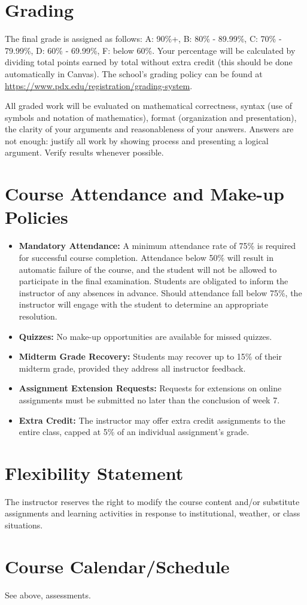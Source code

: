 \documentclass{article}
\begin{document}
	\section*{Grading}
	The final grade is assigned as follows: A: 90\%+, B: 80\% - 89.99\%, C: 70\% -
	79.99\%, D: 60\% - 69.99\%, F: below 60\%. Your percentage will be calculated
	by dividing total points earned by total without extra credit (this should be done
	automatically in Canvas). The school's grading policy can be found at
    \url{https://www.pdx.edu/registration/grading-system}.

	\noindent
	All graded work will be evaluated on mathematical correctness, syntax (use of symbols
	and notation of mathematics), format (organization and presentation), the
	clarity of your arguments and reasonableness of your answers. Answers are not enough:
	justify all work by showing process and presenting a logical argument. Verify results
	whenever possible.

	\section*{Course Attendance and Make-up Policies}
	\begin{itemize}
		\item \textbf{Mandatory Attendance:} A minimum attendance rate of 75\% is required
			for successful course completion. Attendance below 50\% will result in automatic
			failure of the course, and the student will not be allowed to participate
			in the final examination. Students are obligated to inform the instructor of
			any absences in advance. Should attendance fall below 75\%, the instructor
			will engage with the student to determine an appropriate resolution.

		\item \textbf{Quizzes:} No make-up opportunities are available for missed
			quizzes.

		\item \textbf{Midterm Grade Recovery:} Students may recover up to 15\% of their
			midterm grade, provided they address all instructor feedback.

		\item \textbf{Assignment Extension Requests:} Requests for extensions on
			online assignments must be submitted no later than the conclusion of week
			7.

		\item \textbf{Extra Credit:} The instructor may offer extra credit
			assignments to the entire class, capped at 5\% of an individual assignment's
			grade.
	\end{itemize}

	\section*{Flexibility Statement}
	The instructor reserves the right to modify the course content and/or
	substitute assignments and learning activities in response to institutional, weather,
	or class situations.

	\section*{Course Calendar/Schedule}
	See above, assessments.

    \PSUPolicies
\end{document}
